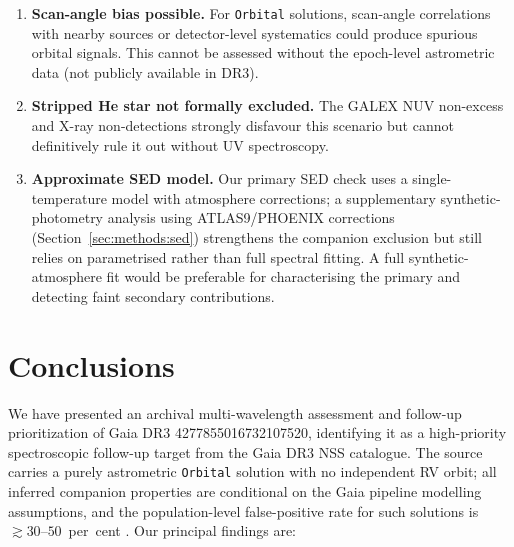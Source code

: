 \documentclass[usenatbib,fleqn]{mnras}
\begin{document}
\begin{enumerate}
\item \textbf{Scan-angle bias possible.}  For \texttt{Orbital}
  solutions, scan-angle correlations with nearby sources or
  detector-level systematics could produce spurious orbital
  signals.  This cannot be assessed without the epoch-level
  astrometric data (not publicly available in DR3).

\item \textbf{Stripped He star not formally excluded.}  The GALEX
  NUV non-excess and X-ray non-detections strongly disfavour
  this scenario but cannot definitively rule it out without UV
  spectroscopy.

\item \textbf{Approximate SED model.}  Our primary SED check uses a
  single-temperature model with atmosphere corrections; a
  supplementary synthetic-photometry analysis using ATLAS9/PHOENIX
  corrections (Section~\ref{sec:methods:sed}) strengthens the
  companion exclusion but still relies on parametrised rather than
  full spectral fitting.  A full synthetic-atmosphere fit would be
  preferable for characterising the primary and detecting faint
  secondary contributions.
\end{enumerate}

\section{Conclusions}
\label{sec:conclusions}

We have presented an archival multi-wavelength assessment and
follow-up prioritization of
Gaia DR3 4277855016732107520, identifying it as a high-priority
spectroscopic follow-up target from the Gaia DR3 NSS catalogue.
The source carries a purely astrometric \texttt{Orbital} solution
with no independent RV orbit; all inferred companion properties are
conditional on the Gaia pipeline modelling assumptions, and the
population-level false-positive rate for such solutions is
$\gtrsim 30$--$50$~per~cent \citep{ElBadry2024}.  Our principal
findings are:
\end{document}
